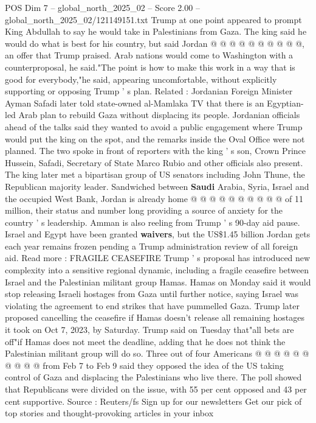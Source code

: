 \begin{textsample}{POS Dim 7 – global\_north\_2025\_02 – Score 2.00 – global\_north\_2025\_02/121149151.txt}
Trump at one point appeared to prompt King Abdullah to say he would take in Palestinians from Gaza.
The king said he would do what is best for his country, but said Jordan @ @ @ @ @ @ @ @ @ @, an offer that Trump praised.
Arab nations would come to Washington with a counterproposal, he said."The point is how to make this work in a way that is good for everybody,"he said, appearing uncomfortable, without explicitly supporting or opposing Trump ' s plan.
Related : Jordanian Foreign Minister Ayman Safadi later told state-owned al-Mamlaka TV that there is an Egyptian-led Arab plan to rebuild Gaza without displacing its people.
Jordanian officials ahead of the talks said they wanted to avoid a public engagement where Trump would put the king on the spot, and the remarks inside the Oval Office were not planned.
The two spoke in front of reporters with the king ' s son, Crown Prince Hussein, Safadi, Secretary of State Marco Rubio and other officials also present.
The king later met a bipartisan group of US senators including John Thune, the Republican majority leader.
Sandwiched between \textbf{Saudi} Arabia, Syria, Israel and the occupied West Bank, Jordan is already home @ @ @ @ @ @ @ @ @ @ of 11 million, their status and number long providing a source of anxiety for the country ' s leadership.
Amman is also reeling from Trump ' s 90-day aid pause.
Israel and Egypt have been granted \textbf{waivers}, but the US\$1.45 billion Jordan gets each year remains frozen pending a Trump administration review of all foreign aid.
Read more : FRAGILE CEASEFIRE Trump ' s proposal has introduced new complexity into a sensitive regional dynamic, including a fragile ceasefire between Israel and the Palestinian militant group Hamas.
Hamas on Monday said it would stop releasing Israeli hostages from Gaza until further notice, saying Israel was violating the agreement to end strikes that have pummelled Gaza.
Trump later proposed cancelling the ceasefire if Hamas doesn't release all remaining hostages it took on Oct 7, 2023, by Saturday.
Trump said on Tuesday that"all bets are off"if Hamas does not meet the deadline, adding that he does not think the Palestinian militant group will do so.
Three out of four Americans @ @ @ @ @ @ @ @ @ @ from Feb 7 to Feb 9 said they opposed the idea of the US taking control of Gaza and displacing the Palestinians who live there.
The poll showed that Republicans were divided on the issue, with 55 per cent opposed and 43 per cent supportive.
Source : Reuters/fs Sign up for our newsletters Get our pick of top stories and thought-provoking articles in your inbox

\end{textsample}

